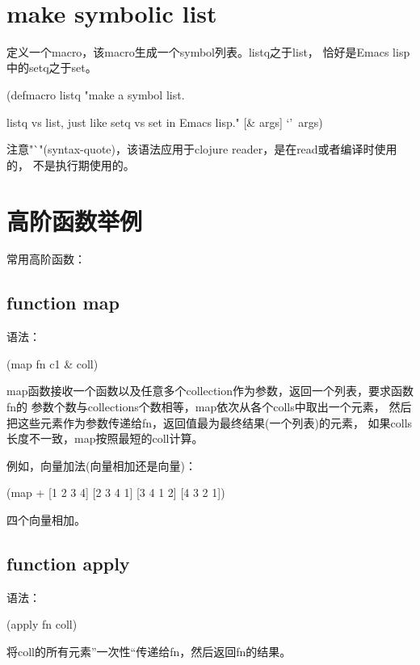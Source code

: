 \documentclass[a4paper,11pt]{article}
\begin{document}
  \tt %
  \pagestyle{header}
  \sybmaketitle
  \tableofcontents
  \newpage

  \pagestyle{main}
  \setcounter{page}{1}

  \section[make symbolic list]{make symbolic list}
  定义一个macro，该macro生成一个symbol列表。listq之于list，
  恰好是Emacs lisp中的setq之于set。

  \begin{schemecode}
    (defmacro listq
    "make a symbol list.
    
    listq vs list, just like setq vs set in Emacs lisp."
    [& args]
    `'~args)    
  \end{schemecode}

  注意"`"(syntax-quote)，该语法应用于clojure reader，是在read或者编译时使用的，
  不是执行期使用的。

  \section[高阶函数举例]{高阶函数举例}
  常用高阶函数：

  \subsection[function map]{function map}
  语法：\par
  (map fn c1 \& coll)

  map函数接收一个函数以及任意多个collection作为参数，返回一个列表，要求函数fn的
  参数个数与collections个数相等，map依次从各个colls中取出一个元素，
  然后把这些元素作为参数传递给fn，返回值最为最终结果(一个列表)的元素，
  如果colls长度不一致，map按照最短的coll计算。

  例如，向量加法(向量相加还是向量)：\par
  (map + [1 2 3 4] [2 3 4 1] [3 4 1 2] [4 3 2 1])\par
  四个向量相加。

  \subsection[function apply]{function apply}
  语法：\par
  (apply fn coll)

  将coll的所有元素”一次性“传递给fn，然后返回fn的结果。
\end{document}
